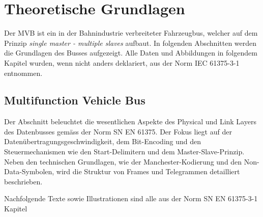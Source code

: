 



\chapter{Theoretische Grundlagen} %
\label{Chapter2TheoretischeGrundlagen} %
Der MVB ist ein in der Bahnindustrie verbreiteter Fahrzeugbus, welcher auf dem Prinzip \textit{single master - multiple slaves} aufbaut. In folgenden Abschnitten werden die Grundlagen des Busses aufgezeigt. Alle Daten und Abbildungen in folgendem Kapitel wurden, wenn nicht anders deklariert, aus der Norm IEC 61375-3-1 entnommen. \cite{MVB_Norm} 


\section{Multifunction Vehicle Bus}


Der Abschnitt beleuchtet die wesentlichen Aspekte des Physical und Link Layers des Datenbusses gemäss der Norm SN EN 61375. Der Fokus liegt auf der Datenübertragungsgeschwindigkeit, dem Bit-Encoding und den Steuermechanismen wie den Start-Delimitern und dem Master-Slave-Prinzip. Neben den technischen Grundlagen, wie der Manchester-Kodierung und den Non-Data-Symbolen, wird die Struktur von Frames und Telegrammen detailliert beschrieben.

Nachfolgende Texte sowie Illustrationen sind alle aus der Norm SN EN 61375-3-1 Kapitel 


